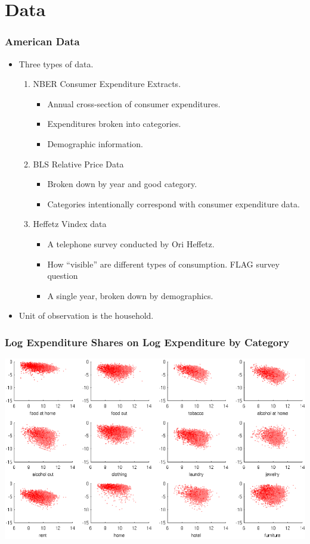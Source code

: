 \documentclass{beamer}
\begin{document}
 \section{Data}
 \begin{frame}
	\frametitle{American Data}
	\begin{itemize} 
	  \item Three types of data.
	    \begin{enumerate}
	      \item NBER Consumer Expenditure Extracts.
		\begin{itemize}
		  \item Annual cross-section of consumer expenditures.
		  \item Expenditures broken into categories.
		  \item Demographic information.
		\end{itemize} 
	      \item BLS Relative Price Data
		\begin{itemize}
		  \item Broken down by year and good category.
		  \item Categories intentionally correspond with consumer expenditure data.
		\end{itemize}
	      \item Heffetz Vindex data
		\begin{itemize}
		  \item A telephone survey conducted by Ori Heffetz.
		  \item How ``visible'' are different types of consumption. FLAG survey question
		  \item A single year, broken down by demographics.  
		\end{itemize}
	    \end{enumerate}
	  \item Unit of observation is the household.
	\end{itemize}
 \end{frame}
 \begin{frame}
   \frametitle{Log Expenditure Shares on Log Expenditure by Category}
   \includegraphics[scale = .70]{pics/shares_cropped_cropped.pdf}
 \end{frame}
\end{document}
